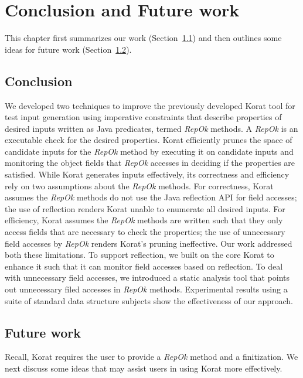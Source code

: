 \chapter{Conclusion and Future work}
\label{ch:conclusion-and-future-work}

This chapter first summarizes our work (Section~\ref{sec:conclusion}) and
then outlines some ideas for future work (Section~\ref{sec:future-work}).

\section{Conclusion}
\label{sec:conclusion}
We developed two techniques to improve the previously developed Korat
tool for test input generation using imperative constraints that
describe properties of desired inputs written as Java predicates,
termed \emph{RepOk} methods.  A \emph{RepOk} is an executable check
for the desired properties.  Korat efficiently prunes the space of
candidate inputs for the \emph{RepOk} method by executing it on
candidate inputs and monitoring the object fields that \emph{RepOk}
accesses in deciding if the properties are satisfied.  While Korat
generates inputs effectively, its correctness and efficiency rely on
two assumptions about the \emph{RepOk} methods.  For correctness, Korat
assumes the \emph{RepOk} methods do not use the Java reflection API
for field accesses; the use of reflection renders Korat unable to
enumerate all desired inputs.  For efficiency, Korat assumes the
\emph{RepOk} methods are written such that they only access fields
that are necessary to check the properties; the use of unnecessary
field accesses by \emph{RepOk} renders Korat's pruning ineffective.
Our work addressed both these limitations.  To support reflection, we
built on the core Korat to enhance it such that it can monitor field
accesses based on reflection.  To deal with unnecessary field
accesses, we introduced a static analysis tool that points out
unnecessary filed accesses in \emph{RepOk} methods. Experimental
results using a suite of standard data structure subjects show the
effectiveness of our approach.


\section{Future work}
\label{sec:future-work}
Recall, Korat requires the user to provide a \emph{RepOk} method and a
finitization.  We next discuss some ideas that may assist users in
using Korat more effectively.

